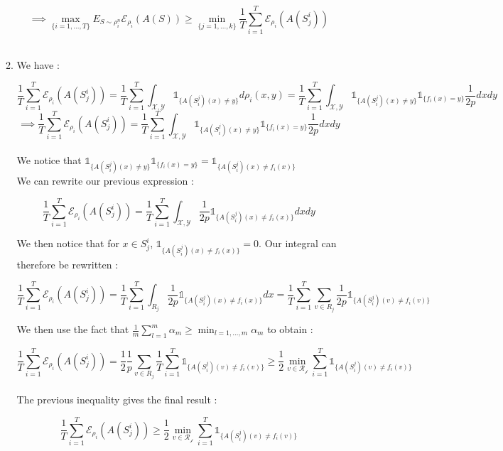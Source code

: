 \documentclass[final,3p,times,12pt]{article}
\begin{document}
\begin{enumerate}
\begin{enumerate}
\[ \implies
\max_{\{i=1, ..., T\}}E_{S \sim \rho_i^n} \mathcal{E}_{\rho_i}(A(S)) \geq \min_{\{j=1, ..., k\}} \frac{1}{T} \sum_{i=1}^T \mathcal{E}_{\rho_i}(A(S_j^i)) 
\]\\

\item We have : 

\[
\frac{1}{T} \sum_{i=1}^{T} \mathcal{E}_{\rho_i}(A(S_j^i)) =  \frac{1}{T} \sum_{i=1}^{T} \int_{\mathcal{X}, \mathcal{Y}} \mathbb{1}_{\{A(S_i^j)(x) \neq y\}} d\rho_i(x,y) = \frac{1}{T} \sum_{i=1}^{T} \int_{\mathcal{X}, \mathcal{Y}} \mathbb{1}_{\{A(S_i^j)(x) \neq y\}} \mathbb{1}_{\{f_i(x) = y\}} \frac{1}{2p} dxdy
\]
\[ \implies
\frac{1}{T} \sum_{i=1}^{T} \mathcal{E}_{\rho_i}(A(S_j^i)) = \frac{1}{T} \sum_{i=1}^{T} \int_{\mathcal{X}, \mathcal{Y}} \mathbb{1}_{\{A(S_i^j)(x) \neq y\}} \mathbb{1}_{\{f_i(x) = y\}} \frac{1}{2p} dxdy
\]\\

We notice that $\mathbb{1}_{\{A(S_i^j)(x) \neq y\}} \mathbb{1}_{\{f_i(x) = y\}} = \mathbb{1}_{\{A(S_i^j)(x) \neq f_i(x)\}}$\\

We can rewrite our previous expression : 

\[
\frac{1}{T} \sum_{i=1}^{T} \mathcal{E}_{\rho_i}(A(S_j^i)) = \frac{1}{T} \sum_{i=1}^{T} \int_{\mathcal{X}, \mathcal{Y}} \frac{1}{2p} \mathbb{1}_{\{A(S_i^j)(x) \neq f_i(x)\}} dxdy
\]

We then notice that for $x \in S_j^i$, $\mathbb{1}_{\{A(S_i^j)(x) \neq f_i(x)\}} = 0$. Our integral can therefore be rewritten : 

\[
\frac{1}{T} \sum_{i=1}^{T} \mathcal{E}_{\rho_i}(A(S_j^i)) = \frac{1}{T} \sum_{i=1}^{T} \int_{R_j} \frac{1}{2p} \mathbb{1}_{\{A(S_i^j)(x) \neq f_i(x)\}} dx = \frac{1}{T} \sum_{i=1}^{T}\sum_{v\in R_j} \frac{1}{2p} \mathbb{1}_{\{A(S_i^j)(v) \neq f_i(v)\}}
\]

We then use the fact that $\frac{1}{m}\sum_{l=1}^m\alpha_m \geq \min_{l=1,\dots,m} \alpha_m$ to obtain : 

\[
\frac{1}{T} \sum_{i=1}^{T} \mathcal{E}_{\rho_i}(A(S_j^i)) = \frac{1}{2}\frac{1}{p}\sum_{v\in R_j}  \frac{1}{T} \sum_{i=1}^{T} \mathbb{1}_{\{A(S_i^j)(v) \neq f_i(v)\}} \geq \frac{1}{2} \min_{v\in\mathcal{R_j}}\sum_{i=1}^{T} \mathbb{1}_{\{A(S_i^j)(v) \neq f_i(v)\}}
\]\\

The previous inequality gives the final result :

\[
\frac{1}{T} \sum_{i=1}^{T} \mathcal{E}_{\rho_i}(A(S_j^i)) \geq \frac{1}{2} \min_{v\in\mathcal{R_j}}\sum_{i=1}^{T} \mathbb{1}_{\{A(S_i^j)(v) \neq f_i(v)\}}
\]\\


\end{enumerate}
\end{enumerate}
\end{document}
